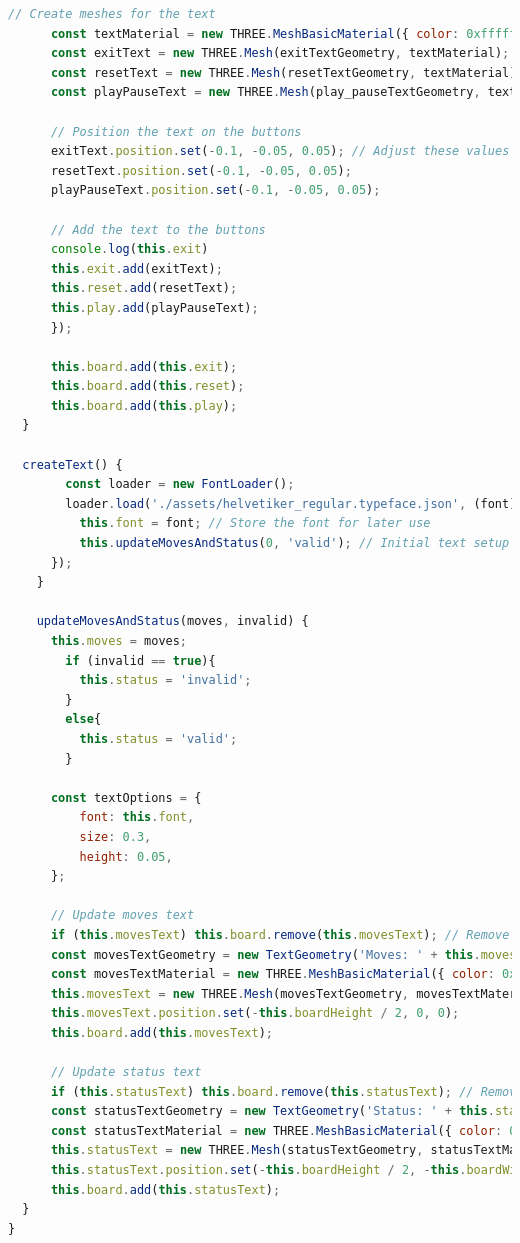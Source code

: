 \documentclass{article}
\begin{document}
\begin{lstlisting}[language=JavaScript, caption={JS Class for Board}]
      // Create meshes for the text
      const textMaterial = new THREE.MeshBasicMaterial({ color: 0xffffff });
      const exitText = new THREE.Mesh(exitTextGeometry, textMaterial);
      const resetText = new THREE.Mesh(resetTextGeometry, textMaterial);
      const playPauseText = new THREE.Mesh(play_pauseTextGeometry, textMaterial);

      // Position the text on the buttons
      exitText.position.set(-0.1, -0.05, 0.05); // Adjust these values as needed
      resetText.position.set(-0.1, -0.05, 0.05);
      playPauseText.position.set(-0.1, -0.05, 0.05);

      // Add the text to the buttons
      console.log(this.exit)
      this.exit.add(exitText);
      this.reset.add(resetText);
      this.play.add(playPauseText);
      });

      this.board.add(this.exit);
      this.board.add(this.reset);
      this.board.add(this.play);
  }

  createText() {
        const loader = new FontLoader();
        loader.load('./assets/helvetiker_regular.typeface.json', (font) => {
          this.font = font; // Store the font for later use
          this.updateMovesAndStatus(0, 'valid'); // Initial text setup
      });
    }

    updateMovesAndStatus(moves, invalid) {
      this.moves = moves;
        if (invalid == true){
          this.status = 'invalid';
        }
        else{
          this.status = 'valid';
        }

      const textOptions = {
          font: this.font,
          size: 0.3,
          height: 0.05,
      };

      // Update moves text
      if (this.movesText) this.board.remove(this.movesText); // Remove old text
      const movesTextGeometry = new TextGeometry('Moves: ' + this.moves, textOptions);
      const movesTextMaterial = new THREE.MeshBasicMaterial({ color: 0xffffff });
      this.movesText = new THREE.Mesh(movesTextGeometry, movesTextMaterial);
      this.movesText.position.set(-this.boardHeight / 2, 0, 0);
      this.board.add(this.movesText);

      // Update status text
      if (this.statusText) this.board.remove(this.statusText); // Remove old text
      const statusTextGeometry = new TextGeometry('Status: ' + this.status, textOptions);
      const statusTextMaterial = new THREE.MeshBasicMaterial({ color: 0xffffff });
      this.statusText = new THREE.Mesh(statusTextGeometry, statusTextMaterial);
      this.statusText.position.set(-this.boardHeight / 2, -this.boardWidth / 4, 0);
      this.board.add(this.statusText);
  }
}
\end{lstlisting}
\end{document}
